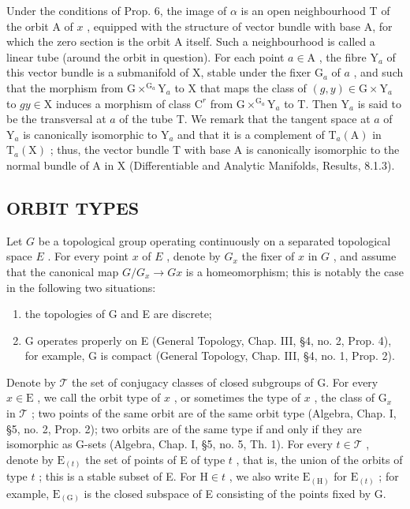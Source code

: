 Under the conditions of Prop. 6, the image of \(\alpha\) is an open neighbourhood T of the orbit A of \(x\) , equipped with the structure of vector bundle with base A, for which the zero section is the orbit A itself. Such a neighbourhood is called a linear tube (around the orbit in question). For each point \(a \in \mathrm{A}\) , the fibre \(\mathrm{Y}_a\) of this vector bundle is a submanifold of X, stable under the fixer \(\mathrm{G}_a\) of \(a\) , and such that the morphism from \(\mathrm{G} \times^{\mathrm{G}_a}\mathrm{Y}_a\) to X that maps the class of \((g,y) \in \mathrm{G} \times \mathrm{Y}_a\) to \(gy \in \mathrm{X}\) induces a morphism of class \(\mathrm{C}^r\) from \(\mathrm{G} \times^{\mathrm{G}_a}\mathrm{Y}_a\) to T. Then \(\mathrm{Y}_a\) is said to be the transversal at \(a\) of the tube T. We remark that the tangent space at \(a\) of \(\mathrm{Y}_a\) is canonically isomorphic to \(\mathrm{Y}_a\) and that it is a complement of \(\mathrm{T}_a(\mathrm{A})\) in \(\mathrm{T}_a(\mathrm{X})\) ; thus, the vector bundle T with base A is canonically isomorphic to the normal bundle of A in X (Differentiable and Analytic Manifolds, Results, 8.1.3).

\subsection{ORBIT TYPES}

Let \(G\) be a topological group operating continuously on a separated topological space \(E\) . For every point \(x\) of \(E\) , denote by \(G_x\) the fixer of \(x\) in \(G\) , and assume that the canonical map \(G / G_x \to Gx\) is a homeomorphism; this is notably the case in the following two situations:

\begin{enumerate}
\def\labelenumi{\alph{enumi})}
\item
  the topologies of G and E are discrete;
\item
  G operates properly on E (General Topology, Chap. III, §4, no. 2, Prop. 4), for example, G is compact (General Topology, Chap. III, §4, no. 1, Prop. 2).
\end{enumerate}

Denote by \(\mathcal{T}\) the set of conjugacy classes of closed subgroups of G. For every \(x\in \mathrm{E}\) , we call the orbit type of \(x\) , or sometimes the type of \(x\) , the class of \(\mathrm{G}_x\) in \(\mathcal{T}\) ; two points of the same orbit are of the same orbit type (Algebra, Chap. I, §5, no. 2, Prop. 2); two orbits are of the same type if and only if they are isomorphic as G-sets (Algebra, Chap. I, §5, no. 5, Th. 1). For every \(t\in \mathcal{T}\) , denote by \(\mathrm{E}_{(t)}\) the set of points of E of type \(t\) , that is, the union of the orbits of type \(t\) ; this is a stable subset of E. For \(\mathrm{H}\in t\) , we also write \(\mathrm{E}_{(\mathrm{H})}\) for \(\mathrm{E}_{(t)}\) ; for example, \(\mathrm{E}_{(\mathrm{G})}\) is the closed subspace of E consisting of the points fixed by G.

